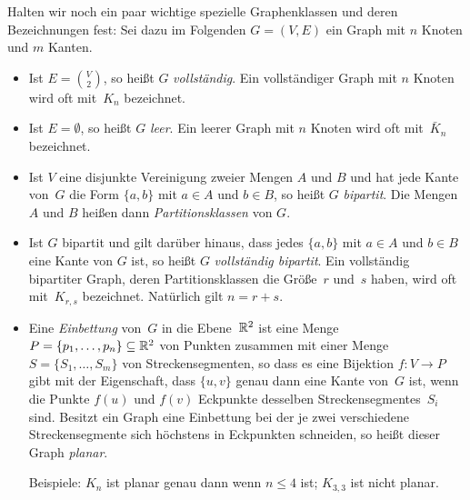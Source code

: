 \begin{defn} 
Halten wir noch ein paar wichtige spezielle Graphenklassen und deren Bezeichnungen fest: Sei dazu im Folgenden $G=(V,E)$ ein Graph mit $n$ Knoten und $m$ Kanten.
\begin{itemize}
 \item Ist $E=\binom{V}{2}$, so heißt $G$ \emph{vollständig}.
 Ein vollständiger Graph mit $n$ Knoten wird oft mit~$K_n$ bezeichnet.

 \item Ist $E=\emptyset$, so heißt $G$ \emph{leer}.
 Ein leerer Graph mit $n$ Knoten wird oft mit~$\bar K_n$ bezeichnet.

 \item Ist $V$ eine disjunkte Vereinigung zweier Mengen $A$ und $B$ und hat jede Kante von~$G$ die Form $\{a,b\}$ mit $a \in A$ und $b \in B$, so heißt $G$ \emph{bipartit}.
 Die Mengen~$A$ und $B$ heißen dann \emph{Partitionsklassen} von $G$.
 
 \item Ist $G$ bipartit und gilt darüber hinaus, dass jedes $\{a,b\}$ mit $a \in A$ und $b \in B$ eine Kante von $G$ ist, so heißt $G$ \emph{vollständig bipartit}.
 Ein vollständig bipartiter Graph, deren Partitionsklassen die Größe~$r$ und~$s$ haben, wird oft mit~$K_{r,s}$ bezeichnet.
 Natürlich gilt $n = r + s$.
 
 \item Eine \emph{Einbettung} von~$G$ in die Ebene~$\mathbb{R}^2$ ist eine Menge $P=\{p_1,\ldots,p_n\} \subseteq \mathbb{R}^2$ von Punkten zusammen mit einer Menge $S=\{S_1,\ldots,S_m\}$ von Streckensegmenten, so dass es eine Bijektion $f:V \to P$ gibt mit der Eigenschaft, dass $\{u,v\}$ genau dann eine Kante von~$G$ ist, wenn die Punkte $f(u)$ und $f(v)$ Eckpunkte desselben Streckensegmentes~$S_i$ sind.
 Besitzt ein Graph eine Einbettung bei der je zwei verschiedene Streckensegmente sich höchstens in Eckpunkten schneiden, so heißt dieser Graph \emph{planar}.
 
 Beispiele: $K_n$ ist planar genau dann wenn $n\leq4$ ist; $K_{3,3}$ ist nicht planar.
\end{itemize}
\end{defn} 

